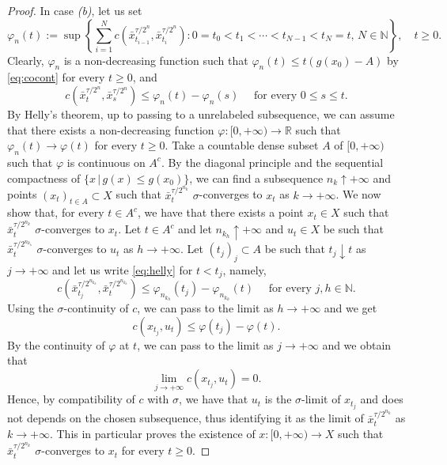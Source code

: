 \documentclass[reqno]{amsart}
\theoremstyle{plain}
\theoremstyle{remark}
\theoremstyle{plain}
\numberwithin{equation}{section}
\theoremstyle{remark}
\newcommand{\N}{\mathbb{N}}
\newcommand{\R}{\mathbb{R}}
\begin{document}
\begin{proof}
In case {\it (b)}, let us set
\[ \varphi_n(t):=\sup \left \{ \sum_{i=1}^N c(\bar{x}_{t_{i-1}}^{\tau/2^n}, \bar{x}_{t_{i}}^{\tau/2^n}) : 0=t_0 < t_1 < \cdots < t_{N-1} < t_N=t, \, N \in \N \right \}, \quad t \ge 0. \]
Clearly, $\varphi_n$ is a non-decreasing function such that $\varphi_n(t) \le t (g(x_0)-A)$ by \eqref{eq:cocont} for every $t \ge 0$, and
\begin{equation}\label{eq:helly}
c(\bar{x}_{t}^{\tau/2^n}, \bar{x}_{s}^{\tau/2^n}) \le \varphi_n(t) - \varphi_n(s)  \quad \text{ for every } 0 \le s \le t.   
\end{equation}
By Helly's theorem, up to passing to a unrelabeled subsequence, we can assume that there exists a non-decreasing function $\varphi:[0,+\infty) \to \R$ such that $\varphi_n(t) \to \varphi(t)$ for every $t \ge 0$.  Take  a countable dense subset $A$ of $[0,+\infty)$ such that $\varphi$ is continuous on $A^c$. By the diagonal principle and  the  sequential compactness of $\{x\, |\, g(x)\le g(x_0) \}$,  we can find a subsequence $n_k \uparrow + \infty$ and points $(x_t)_{t \in A} \subset X$ such that $\bar{x}_t^{\tau/2^{n_k}}$ $\sigma$-converges to $x_t$ as $k \to +\infty$. We now show that, for every  $t \in A^c$, we have that there exists a point $x_t \in X$ such that $\bar{x}_t^{\tau/2^{n_k}}$ $\sigma$-converges to $x_t$. Let $t \in A^c$ and let $n_{k_h} \uparrow + \infty$ and $u_t \in X$ be such that $\bar{x}_t^{\tau/2^{n_{k_h}}}$ $\sigma$-converges to $u_t$ as $h \to + \infty$. Let $(t_j)_j \subset A$ be such that $t_j \downarrow t$ as $j \to +\infty$ and let us write \eqref{eq:helly} for $t < t_j$,  namely, 
\[c(\bar{x}_{t_j}^{\tau/2^{n_{k_h}}}, \bar{x}_{t}^{\tau/2^{n_{k_h}}}) \le \varphi_{n_{k_h}}(t_j) - \varphi_{n_{k_h}}(t)  \quad \text{ for every } j,h \in \N.\]
Using the $\sigma$-continuity of $c$, we can pass to the limit as $h \to + \infty$ and we get
\[ c(x_{t_j}, u_t) \le \varphi(t_j) - \varphi(t).\]
By  the  continuity of $\varphi$ at $t$, we can pass to the limit as $j \to +\infty$ and we obtain that
\[ \lim_{j \to +\infty} c(x_{t_j}, u_t)=0.\]
Hence, by compatibility of $c$ with $\sigma$,  we have  that $u_t$ is the $\sigma$-limit of $x_{t_j}$ and does not depends on the chosen subsequence, thus identifying it as the limit of $\bar{x}_t^{\tau/2^{n_k}}$ as $k \to +\infty$.
This in particular proves the existence of $x:[0,+\infty) \to X$ such that $\bar{x}_t^{\tau/2^{n_k}}$ $\sigma$-converges to $x_t$ for every $t \ge 0$.


\end{proof}
\end{document}
